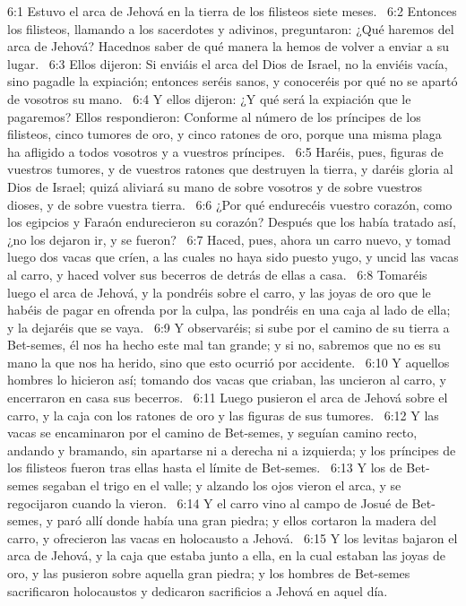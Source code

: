 6:1 Estuvo el arca de Jehová en la tierra de los filisteos siete meses.  
6:2 Entonces los filisteos, llamando a los sacerdotes y adivinos, preguntaron: ¿Qué haremos del arca de Jehová? Hacednos saber de qué manera la hemos de volver a enviar a su lugar.  
6:3 Ellos dijeron: Si enviáis el arca del Dios de Israel, no la enviéis vacía, sino pagadle la expiación; entonces seréis sanos, y conoceréis por qué no se apartó de vosotros su mano.  
6:4 Y ellos dijeron: ¿Y qué será la expiación que le pagaremos? Ellos respondieron: Conforme al número de los príncipes de los filisteos, cinco tumores de oro, y cinco ratones de oro, porque una misma plaga ha afligido a todos vosotros y a vuestros príncipes.  
6:5 Haréis, pues, figuras de vuestros tumores, y de vuestros ratones que destruyen la tierra, y daréis gloria al Dios de Israel; quizá aliviará su mano de sobre vosotros y de sobre vuestros dioses, y de sobre vuestra tierra.  
6:6 ¿Por qué endurecéis vuestro corazón, como los egipcios y Faraón endurecieron su corazón? Después que los había tratado así, ¿no los dejaron ir, y se fueron?  
6:7 Haced, pues, ahora un carro nuevo, y tomad luego dos vacas que críen, a las cuales no haya sido puesto yugo, y uncid las vacas al carro, y haced volver sus becerros de detrás de ellas a casa.  
6:8 Tomaréis luego el arca de Jehová, y la pondréis sobre el carro, y las joyas de oro que le habéis de pagar en ofrenda por la culpa, las pondréis en una caja al lado de ella; y la dejaréis que se vaya.  
6:9 Y observaréis; si sube por el camino de su tierra a Bet-semes, él nos ha hecho este mal tan grande; y si no, sabremos que no es su mano la que nos ha herido, sino que esto ocurrió por accidente.  
6:10 Y aquellos hombres lo hicieron así; tomando dos vacas que criaban, las uncieron al carro, y encerraron en casa sus becerros.  
6:11 Luego pusieron el arca de Jehová sobre el carro, y la caja con los ratones de oro y las figuras de sus tumores.  
6:12 Y las vacas se encaminaron por el camino de Bet-semes, y seguían camino recto, andando y bramando, sin apartarse ni a derecha ni a izquierda; y los príncipes de los filisteos fueron tras ellas hasta el límite de Bet-semes.  
6:13 Y los de Bet-semes segaban el trigo en el valle; y alzando los ojos vieron el arca, y se regocijaron cuando la vieron.  
6:14 Y el carro vino al campo de Josué de Bet-semes, y paró allí donde había una gran piedra; y ellos cortaron la madera del carro, y ofrecieron las vacas en holocausto a Jehová.  
6:15 Y los levitas bajaron el arca de Jehová, y la caja que estaba junto a ella, en la cual estaban las joyas de oro, y las pusieron sobre aquella gran piedra; y los hombres de Bet-semes sacrificaron holocaustos y dedicaron sacrificios a Jehová en aquel día.  
